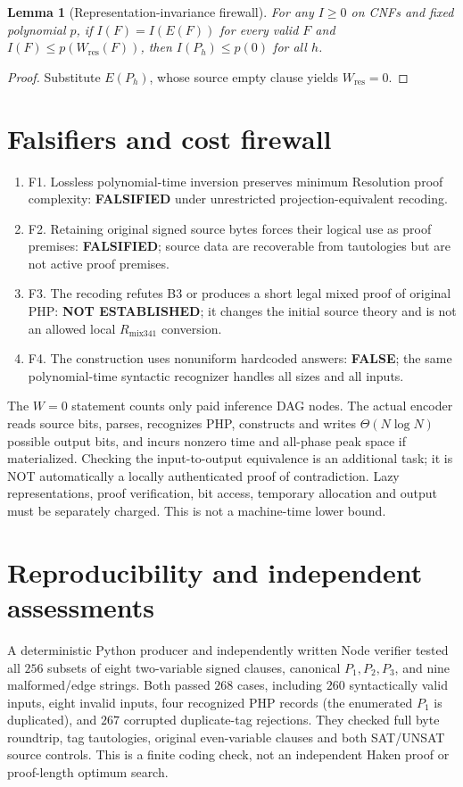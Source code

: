 \documentclass[11pt]{article}
\newtheorem{lemma}[theorem]{Lemma}
\begin{document}
\begin{lemma}[Representation-invariance firewall]
For any \(I\ge0\) on CNFs and fixed polynomial \(p\), if \(I(F)=I(E(F))\) for every valid \(F\) and \(I(F)\le p(W_{\mathrm{res}}(F))\), then \(I(P_h)\le p(0)\) for all \(h\).
\end{lemma}
\begin{proof} Substitute \(E(P_h)\), whose source empty clause yields \(W_{\mathrm{res}}=0\).\end{proof}

\section*{Falsifiers and cost firewall}
\begin{enumerate}
\item[] F1. Lossless polynomial-time inversion preserves minimum Resolution proof complexity: \textbf{FALSIFIED} under unrestricted projection-equivalent recoding.
\item[] F2. Retaining original signed source bytes forces their logical use as proof premises: \textbf{FALSIFIED}; source data are recoverable from tautologies but are not active proof premises.
\item[] F3. The recoding refutes B3 or produces a short legal mixed proof of original PHP: \textbf{NOT ESTABLISHED}; it changes the initial source theory and is not an allowed local \(R_{\mathrm{mix341}}\) conversion.
\item[] F4. The construction uses nonuniform hardcoded answers: \textbf{FALSE}; the same polynomial-time syntactic recognizer handles all sizes and all inputs.
\end{enumerate}
The \(W=0\) statement counts only paid inference DAG nodes. The actual encoder reads source bits, parses, recognizes PHP, constructs and writes \(\Theta(N\log N)\) possible output bits, and incurs nonzero time and all-phase peak space if materialized. Checking the input-to-output equivalence is an additional task; it is NOT automatically a locally authenticated proof of contradiction. Lazy representations, proof verification, bit access, temporary allocation and output must be separately charged. This is not a machine-time lower bound.

\section*{Reproducibility and independent assessments}
A deterministic Python producer and independently written Node verifier tested all \(256\) subsets of eight two-variable signed clauses, canonical \(P_1,P_2,P_3\), and nine malformed/edge strings. Both passed \(268\) cases, including \(260\) syntactically valid inputs, eight invalid inputs, four recognized PHP records (the enumerated \(P_1\) is duplicated), and \(267\) corrupted duplicate-tag rejections. They checked full byte roundtrip, tag tautologies, original even-variable clauses and both SAT/UNSAT source controls. This is a finite coding check, not an independent Haken proof or proof-length optimum search.
\end{document}
